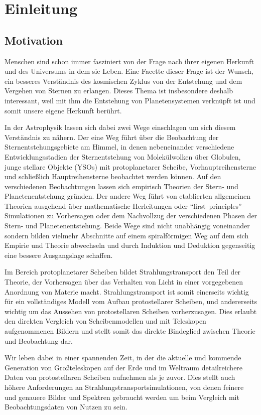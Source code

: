 	\chapter{Einleitung}
	\section{Motivation}
	Menschen sind schon immer fasziniert von der Frage nach ihrer eigenen Herkunft und des Universums in dem sie Leben. Eine Facette dieser Frage ist der Wunsch, ein besseres Verständnis des kosmischen Zyklus von der Entstehung und dem Vergehen von Sternen zu erlangen. Dieses Thema ist insbesondere deshalb interessant, weil mit ihm die Entstehung von Planetensystemen verknüpft ist und somit unsere eigene Herkunft berührt.
	
	In der Astrophysik lassen sich dabei zwei Wege einschlagen um sich diesem Verständnis zu nähern. Der eine Weg führt über die Beobachtung der Sternentstehungsgebiete am Himmel, in denen nebeneinander verschiedene Entwicklungsstadien der Sternentstehung von Molekülwolken über Globulen, junge stellare Objekte (YSOs) mit protoplanetarer Scheibe, Vorhauptreihensterne und schließlich Hauptreihensterne beobachtet werden können. Auf den verschiedenen Beobachtungen lassen sich empirisch Theorien der Stern- und Planetenentstehung gründen. Der andere Weg führt von etablierten allgemeinen Theorien ausgehend über mathematische Herleitungen oder ``first--principles''--Simulationen zu Vorhersagen oder dem Nachvollzug der verschiedenen Phasen der Stern- und Planetenentstehung. Beide Wege sind nicht unabhängig voneinander sondern bilden vielmehr Abschnitte auf einem spiralförmigen Weg auf dem sich Empirie und Theorie abwechseln und durch Induktion und Deduktion gegenseitig eine bessere Ausgangslage schaffen.
	
	Im Bereich protoplanetarer Scheiben bildet Strahlungstransport den Teil der Theorie, der Vorhersagen über das Verhalten von Licht in einer vorgegebenen Anordnung von Materie macht. Strahlungstransport ist somit einerseits wichtig für ein vollständiges Modell vom Aufbau protostellarer Scheiben, und andererseits wichtig um das Aussehen von protostellaren Scheiben vorherzusagen. Dies erlaubt den direkten Vergleich von Scheibenmodellen und mit Teleskopen aufgenommenen Bildern und stellt somit das direkte Bindeglied zwischen Theorie und Beobachtung dar.
	
	Wir leben dabei in einer spannenden Zeit, in der die aktuelle und kommende Generation von Großteleskopen auf der Erde und im Weltraum detailreichere Daten von protostellaren Scheiben aufnehmen als je zuvor. Dies stellt auch höhere Anforderungen an Strahlungstransportsimulationen, von denen feinere und genauere Bilder und Spektren gebraucht werden um beim Vergleich mit Beobachtungsdaten von Nutzen zu sein.
	
